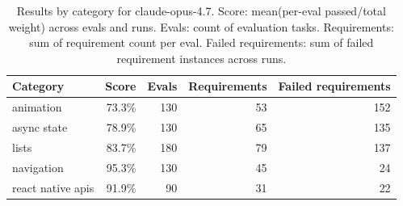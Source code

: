 \begin{table}[htbp]
\centering
\begin{tabular}{lrrrr}
\toprule
Category & Score & Evals & Requirements & Failed requirements \\
\midrule
animation & 73.3\% & 130 & 53 & 152 \\
async state & 78.9\% & 130 & 65 & 135 \\
lists & 83.7\% & 180 & 79 & 137 \\
navigation & 95.3\% & 130 & 45 & 24 \\
react native apis & 91.9\% & 90 & 31 & 22 \\
\bottomrule
\end{tabular}
\caption{Results by category for claude-opus-4.7. Score: mean(per-eval passed/total weight) across evals and runs. Evals: count of evaluation tasks. Requirements: sum of requirement count per eval. Failed requirements: sum of failed requirement instances across runs.}
\end{table}
